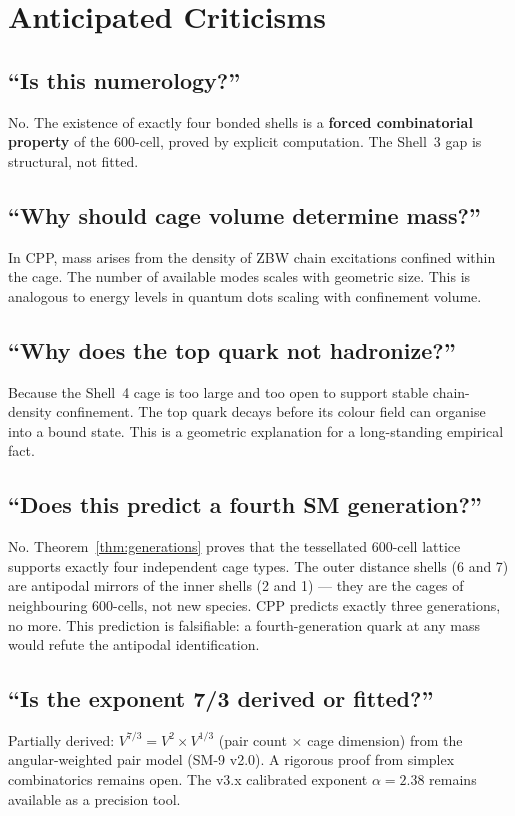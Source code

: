 \documentclass[11pt,letterpaper]{article}
\begin{document}
\section{Anticipated Criticisms}
\label{sec:criticisms}

\subsection{``Is this numerology?''}
No.  The existence of exactly four bonded shells is a
\textbf{forced combinatorial property} of the 600-cell, proved by
explicit computation.  The Shell~3 gap is structural, not fitted.

\subsection{``Why should cage volume determine mass?''}
In CPP, mass arises from the density of ZBW chain excitations
confined within the cage.  The number of available modes scales
with geometric size.  This is analogous to energy levels in quantum
dots scaling with confinement volume.

\subsection{``Why does the top quark not hadronize?''}
Because the Shell~4 cage is too large and too open to support
stable chain-density confinement.  The top quark decays before
its colour field can organise into a bound state.  This is a
geometric explanation for a long-standing empirical fact.

\subsection{``Does this predict a fourth SM generation?''}
No.  Theorem~\ref{thm:generations} proves that the tessellated
600-cell lattice supports exactly four independent cage types.
The outer distance shells (6 and 7) are antipodal mirrors of the
inner shells (2 and 1) --- they are the cages of neighbouring
600-cells, not new species.  CPP predicts exactly three generations,
no more.  This prediction is falsifiable: a fourth-generation quark
at any mass would refute the antipodal identification.

\subsection{``Is the exponent 7/3 derived or fitted?''}
Partially derived: $V^{7/3} = V^2 \times V^{1/3}$ (pair count
$\times$ cage dimension) from the angular-weighted pair model
(SM-9 v2.0).  A rigorous proof from simplex combinatorics remains
open.  The v3.x calibrated exponent $\alpha = 2.38$ remains
available as a precision tool.
\end{document}
